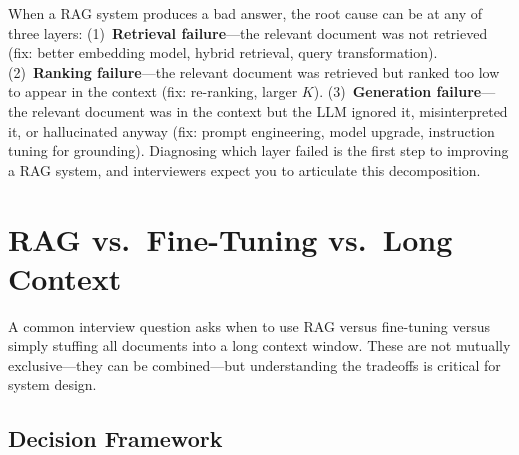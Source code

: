 \begin{keyinsight}
When a RAG system produces a bad answer, the root cause can be at any of three
layers: (1)~\textbf{Retrieval failure}---the relevant document was not
retrieved (fix: better embedding model, hybrid retrieval, query transformation).
(2)~\textbf{Ranking failure}---the relevant document was retrieved but ranked
too low to appear in the context (fix: re-ranking, larger $K$).
(3)~\textbf{Generation failure}---the relevant document was in the context but
the LLM ignored it, misinterpreted it, or hallucinated anyway (fix: prompt
engineering, model upgrade, instruction tuning for grounding).
Diagnosing which layer failed is the first step to improving a RAG system,
and interviewers expect you to articulate this decomposition.
\end{keyinsight}


\section{RAG vs.\ Fine-Tuning vs.\ Long Context}
\label{sec:rag-vs-ft}

A common interview question asks when to use RAG versus fine-tuning versus
simply stuffing all documents into a long context window.  These are not
mutually exclusive---they can be combined---but understanding the tradeoffs
is critical for system design.

\subsection{Decision Framework}

